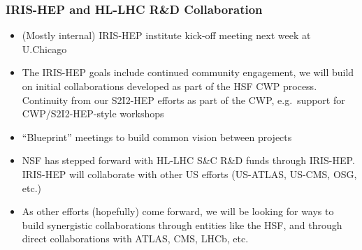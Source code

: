 \begin{frame}
\frametitle{IRIS-HEP and HL-LHC R\&D Collaboration}

\begin{itemize}
\item (Mostly internal) IRIS-HEP institute kick-off meeting next week at U.Chicago
\item The IRIS-HEP goals include continued community engagement, we will build on initial collaborations developed as part of the HSF CWP process. Continuity from our S2I2-HEP efforts as part of the CWP, e.g.\ support for CWP/S2I2-HEP-style workshops
\item ``Blueprint'' meetings to build common vision between projects
\item NSF has stepped forward with HL-LHC S\&C R\&D funds through IRIS-HEP. IRIS-HEP will collaborate with other US efforts (US-ATLAS, US-CMS, OSG, etc.)
\item As other efforts (hopefully) come forward, we will be looking for ways to build synergistic collaborations through entities like the HSF, and through direct collaborations with ATLAS, CMS, LHCb, etc.
\end{itemize}

\end{frame}


